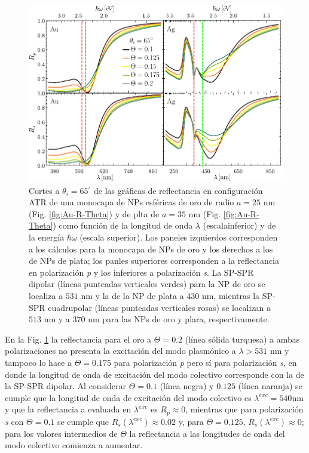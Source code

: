 \begin{figure}[h!]\centering
	\includegraphics[scale=1]{2-Resultados/figs/6-AuThetaVar/0-cut65_Au_Aug.pdf}\vspace*{-.5em}
	\caption{Cortes a $\theta_i = 65^\circ$ de las gráficas de reflectancia  en configuración ATR  de una monocapa de NPs esféricas de oro de radio $a=25$ nm (Fig. \ref{fig:Au-R-Theta}) y de plta de $a=35$ nm (Fig. \ref{fig:Au-R-Theta}) como función de la longitud de onda $\lambda$ (escalainferior) y de la energía $\hbar\omega$ (escala superior). Los paneles izquierdos corresponden a los cálculos para la monocapa de NPs de oro y los derechos a los de NPs de plata; los panles superiores corresponden a la reflectancia en polarización \emph{p} y los inferiores a polarización \emph{s}. La SP-SPR dipolar (líneas punteadas verticales verdes) para la NP de oro se localiza a $531$ nm y la de la NP de plata a $430$ nm, mientras la SP-SPR cuadrupolar (líneas punteadas verticales rosas) se localizan a $513$ nm y a $370$ nm para las NPs de oro y plara, respectivamente. }\label{fig:AuAg-Cuts-65}
	\end{figure}	
	
En la Fig. \ref{fig:AuAg-Cuts-65} la reflectancia  para el oro a $\Theta=0.2$  (línea  sólida turquesa) a ambas polarizaciones no presenta la excitación del modo plasmónico a $\lambda>531$ nm y tampoco lo hace a $\Theta=0.175$ para polarización \emph{p} pero sí para polarización \emph{s}, en donde la longitud de onda de excitación del modo colectivo corresponde con la de la SP-SPR dipolar. Al considerar $\Theta= 0.1$ (línea negra)  y $0.125$ (línea naranja)  se cumple que la longitud de onda de excitación del modo colectivo es $\lambda^{exc} = 540\text {nm}$ y que la reflectancia a evaluada en $\lambda^{exc}$ es $R_p\approx0$, mientras que  para polarización \emph{s} con $\Theta=0.1$ se cumple que $R_s(\lambda^{exc}) \approx0.02$ y, para $\Theta=0.125$, $R_s(\lambda^{exc})\approx 0$; para los valores intermedios de $\Theta$ la reflectancia a las longitudes de onda del modo colectivo comienza a aumentar.

